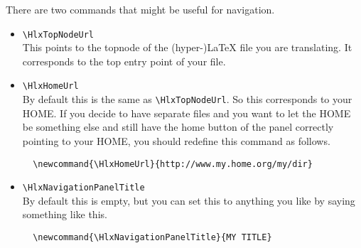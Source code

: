 There are two commands that might be useful for navigation.
\begin{itemize}
\item \verb'\HlxTopNodeUrl'\\
  This points to the topnode of the (hyper-)\LaTeX{} file you are
  translating. It corresponds to the top entry point of your file.
\item \verb'\HlxHomeUrl'\\
  By default this is the same as \verb'\HlxTopNodeUrl'. So this
  corresponds to your HOME. If you decide to have separate files and
  you want to let the HOME be something else and still have the home
  button of the panel correctly pointing to your HOME, you should
  redefine this command as follows.\\
\begin{verbatim}
  \newcommand{\HlxHomeUrl}{http://www.my.home.org/my/dir}
\end{verbatim}
\item \verb'\HlxNavigationPanelTitle'\\
  By default this is empty, but you can set this to anything you like
  by saying something like this.
\begin{verbatim}
  \newcommand{\HlxNavigationPanelTitle}{MY TITLE}
\end{verbatim}
\end{itemize}


